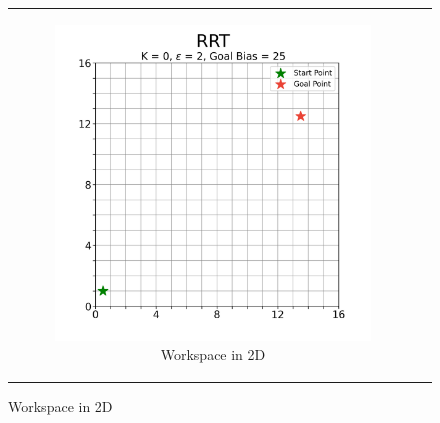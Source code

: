 
\begin{figure}[H]
\begin{centering}
\begin{tabular}{cc}

    \begin{subfigure}{0.47\linewidth}
    \includegraphics[width=\linewidth]{chapters/chapter2/img/visualizing/workspace2d.png}
    \caption{Workspace in 2D}
    \end{subfigure} &


\end{tabular}
\end{centering}
\end{figure}
